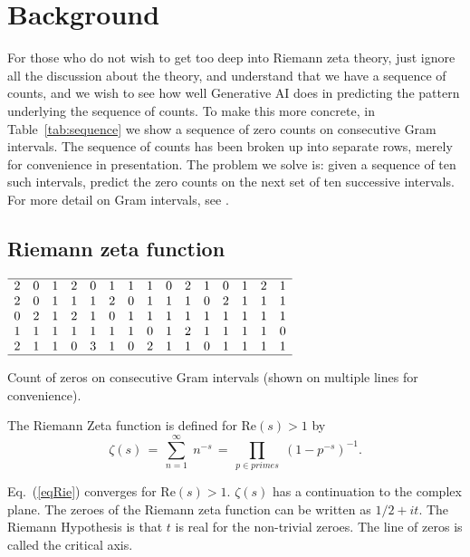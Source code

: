 \documentclass[journal]{IEEEtai}
\begin{document}
\section{Background}

For those who do not wish to get too deep into Riemann zeta theory, just ignore all the discussion about the theory, and understand that we have a sequence of counts, and we wish to see how well Generative AI does in predicting the pattern underlying the sequence of counts. To make this more concrete, in Table~\ref{tab:sequence} we show a sequence of zero counts on consecutive Gram intervals. The sequence of counts has been broken up into separate rows, merely for convenience in presentation. The problem we solve is: given a sequence of ten such intervals, predict the zero counts on the next set of ten successive intervals.
For more detail on Gram intervals, see \cite{Shanker 2018a}.

\subsection{Riemann zeta function}


\begin{table}
\centering \(\begin{array}{ccccccccccccccc}
\hline
2& 0& 1& 2& 0& 1& 1& 1& 0& 2& 1& 0& 1& 2& 1 \\
2& 0& 1& 1& 1& 2& 0& 1& 1& 1& 0& 2& 1& 1& 1 \\
0& 2& 1& 2& 1& 0& 1& 1& 1& 1& 1& 1& 1& 1& 1 \\
1& 1& 1& 1& 1& 1& 1& 0& 1& 2& 1& 1& 1& 1& 0 \\
2& 1& 1& 0& 3& 1& 0& 2& 1& 1& 0& 1& 1& 1& 1 \\
\hline
\end{array}\)
\caption{Count of zeros on consecutive Gram intervals (shown on multiple lines for convenience).} 
\label{tab:sequence}
\end{table}


The Riemann Zeta function is defined for $\mathrm{Re} (s) > 1$ by
\begin{equation}
\zeta ( s ) \, = \, \sum^{\infty}_{n = 1} \; n^{-s} \, = \, \prod_{p \in primes} \;
\left( 1 - p^{-s} \right)^{-1}.
\label{eqRie}
\end{equation}

Eq.~(\ref{eqRie})  converges for $\mathrm{Re} (s) > 1$.  
 $\zeta ( s )$ has a  continuation
to the complex plane. The zeroes of the Riemann zeta function can be written as $1/2 + i t$. The Riemann Hypothesis  
is that $t$ is real for the non-trivial zeroes. The line of zeros is called the critical axis.
\end{document}
